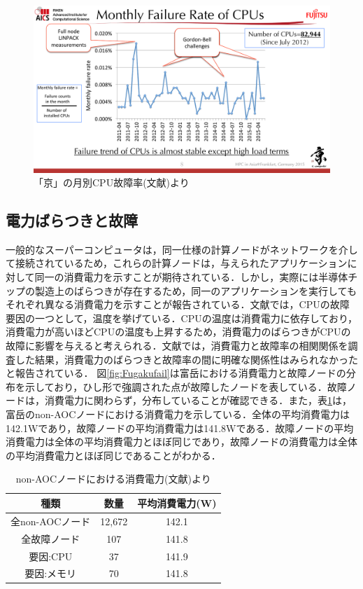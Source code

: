 \documentclass[a4paper,11pt,twocolumn]{jsarticle}
\begin{document}
\begin{figure}[h]
  \centering
  \includegraphics[width=0.8\linewidth]{figure/Kfail.pdf}
  \caption{「京」の月別CPU故障率(文献\cite{k_HPC})より}
  \label{fig:Kfail}
\end{figure}

\subsection{電力ばらつきと故障}
一般的なスーパーコンピュータは，同一仕様の計算ノードがネットワークを介して接続されているため，これらの計算ノードは，与えられたアプリケーションに対して同一の消費電力を示すことが期待されている．しかし，実際には半導体チップの製造上のばらつきが存在するため，同一のアプリケーションを実行してもそれぞれ異なる消費電力を示すことが報告されている．文献\cite{master_kusaba}では，CPUの故障要因の一つとして，温度を挙げている．CPUの温度は消費電力に依存しており，消費電力が高いほどCPUの温度も上昇するため，消費電力のばらつきがCPUの故障に影響を与えると考えられる．文献\cite{master_kusaba}では，消費電力と故障率の相関関係を調査した結果，消費電力のばらつきと故障率の間に明確な関係性はみられなかったと報告されている．
図\ref{fig:Fugakufail}は富岳における消費電力と故障ノードの分布を示しており，ひし形で強調された点が故障したノードを表している．故障ノードは，消費電力に関わらず，分布していることが確認できる．また，表\ref{tab:power}は，富岳のnon-AOCノードにおける消費電力を示している．全体の平均消費電力は142.1Wであり，故障ノードの平均消費電力は141.8Wである．故障ノードの平均消費電力は全体の平均消費電力とほぼ同じであり，故障ノードの消費電力は全体の平均消費電力とほぼ同じであることがわかる．

\begin{table}[h]
  \centering
  \caption{non-AOCノードにおける消費電力(文献\cite{master_kusaba})より}
  \label{tab:power}
  \begin{tabular}{c|cc}
    \hline
    種類 & 数量 & 平均消費電力(W) \\
    \hline 
    \hline
    全non-AOCノード & 12,672 & 142.1  \\
    全故障ノード & 107 & 141.8  \\
    \hline
    要因:CPU & 37 & 141.9 \\
    要因:メモリ & 70 & 141.8 \\
    \hline
  \end{tabular}
\end{table}
\end{document}
